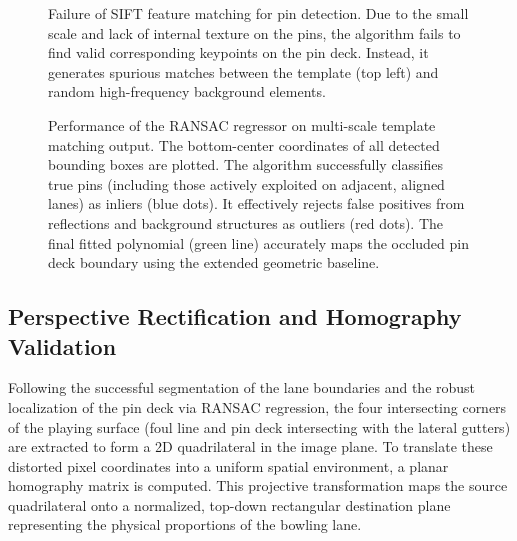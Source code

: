 \begin{figure}[htbp]
    \centering
    \caption{Failure of SIFT feature matching for pin detection. Due to the small scale and lack of internal texture on the pins, the algorithm fails to find valid corresponding keypoints on the pin deck. Instead, it generates spurious matches between the template (top left) and random high-frequency background elements.}
    \label{fig:sift_failure}
\end{figure}

\begin{figure}[htbp]
    \centering
    \caption{Performance of the RANSAC regressor on multi-scale template matching output. The bottom-center coordinates of all detected bounding boxes are plotted. The algorithm successfully classifies true pins (including those actively exploited on adjacent, aligned lanes) as inliers (blue dots). It effectively rejects false positives from reflections and background structures as outliers (red dots). The final fitted polynomial (green line) accurately maps the occluded pin deck boundary using the extended geometric baseline.}
    \label{fig:ransac_pin_deck}
\end{figure}





\subsection{Perspective Rectification and Homography Validation}

Following the successful segmentation of the lane boundaries and the robust localization of the pin deck via RANSAC regression, the four intersecting corners of the playing surface (foul line and pin deck intersecting with the lateral gutters) are extracted to form a 2D quadrilateral in the image plane. To translate these distorted pixel coordinates into a uniform spatial environment, a planar homography matrix is computed. This projective transformation maps the source quadrilateral onto a normalized, top-down rectangular destination plane representing the physical proportions of the bowling lane.

